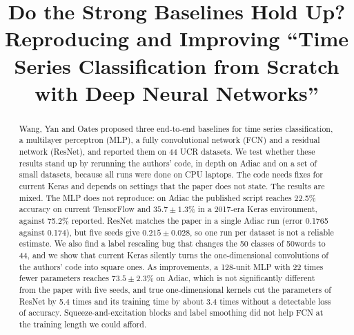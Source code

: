\documentclass[conference]{IEEEtran}
\begin{document}
\title{Do the Strong Baselines Hold Up? Reproducing and Improving ``Time Series Classification from Scratch with Deep Neural Networks''}

\author{
\and
{}
\and
{}
}

\maketitle

\begin{abstract}
Wang, Yan and Oates proposed three end-to-end baselines for time series classification, a multilayer perceptron (MLP), a fully convolutional network (FCN) and a residual network (ResNet), and reported them on 44 UCR datasets. We test whether these results stand up by rerunning the authors' code, in depth on Adiac and on a set of small datasets, because all runs were done on CPU laptops. The code needs fixes for current Keras and depends on settings that the paper does not state. The results are mixed. The MLP does not reproduce: on Adiac the published script reaches 22.5\% accuracy on current TensorFlow and $35.7\pm1.3$\% in a 2017-era Keras environment, against 75.2\% reported. ResNet matches the paper in a single Adiac run (error 0.1765 against 0.174), but five seeds give $0.215\pm0.028$, so one run per dataset is not a reliable estimate. We also find a label rescaling bug that changes the 50 classes of 50words to 44, and we show that current Keras silently turns the one-dimensional convolutions of the authors' code into square ones. As improvements, a 128-unit MLP with 22 times fewer parameters reaches $73.5\pm2.3$\% on Adiac, which is not significantly different from the paper with five seeds, and true one-dimensional kernels cut the parameters of ResNet by 5.4 times and its training time by about 3.4 times without a detectable loss of accuracy. Squeeze-and-excitation blocks and label smoothing did not help FCN at the training length we could afford.
\end{abstract}
\end{document}
